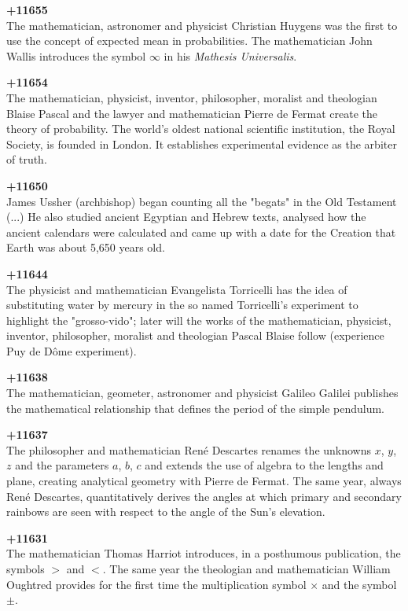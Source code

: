 \textbf{+11655}\\
The mathematician, astronomer and physicist Christian Huygens was the first to use the concept of expected mean in probabilities. The mathematician John Wallis introduces the symbol $\infty$ in his \textit{Mathesis Universalis}.

\textbf{+11654}\\
The mathematician, physicist, inventor, philosopher, moralist and theologian Blaise Pascal and the lawyer and mathematician Pierre de Fermat create the theory of probability. The world's oldest national scientific institution, the Royal Society, is founded in London. It establishes experimental evidence as the arbiter of truth.

\textbf{+11650}\\
James Ussher (archbishop) began counting all the "begats" in the Old Testament (...) He also studied ancient Egyptian and Hebrew texts, analysed how the ancient calendars were calculated and came up with a date for the Creation that Earth was about 5,650 years old.

\textbf{+11644}\\
The physicist and mathematician Evangelista Torricelli has the idea of substituting water by mercury in the so named Torricelli's experiment to highlight the "grosso-vido"; later will the works of the mathematician, physicist, inventor, philosopher, moralist and theologian Pascal Blaise follow (experience Puy de Dôme experiment).

\textbf{+11638}\\
The mathematician, geometer, astronomer and physicist Galileo Galilei publishes the mathematical relationship that defines the period of the simple pendulum.

\textbf{+11637}\\
The philosopher and mathematician René Descartes renames the unknowns $x$, $y$, $z$ and the parameters $a$, $b$, $c$ and extends the use of algebra to the lengths and plane, creating analytical geometry with Pierre de Fermat. The same year, always René Descartes, quantitatively derives the angles at which primary and secondary rainbows are seen with respect to the angle of the Sun's elevation.

\textbf{+11631}\\
The mathematician Thomas Harriot introduces, in a posthumous publication, the symbols $>$ and $<$. The same year the theologian and mathematician William Oughtred provides for the first time the multiplication symbol $\times$ and the symbol $\pm$.


